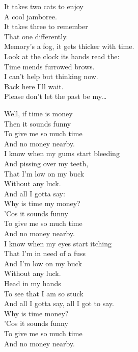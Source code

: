 It takes two cats to enjoy \\
A cool jamboree. \\
It takes three to remember \\
That one differently. \\
Memory's a fog, it gets thicker with time. \\
Look at the clock its hands read the: \\

Time mends furrowed brows. \\
I can't help but thinking now. \\
Back here I'll wait. \\
Please don't let the past be my… \\




Well, if time is money \\
Then it sounds funny \\
To give me so much time \\
And no money nearby. \\

I know when my gums start bleeding \\
And pissing over my teeth, \\
That I'm low on my buck \\
Without any luck. \\
And all I gotta say: \\

Why is time my money? \\
'Cos it sounds funny \\
To give me so much time \\
And no money nearby. \\

I know when my eyes start itching \\
That I'm in need of a fuss \\
And I'm low on my buck \\
Without any luck. \\
Head in my hands \\
To see that I am so stuck \\
And all I gotta say, all I got to say. \\

Why is time money? \\
'Cos it sounds funny \\
To give me so much time \\
And no money nearby. \\

